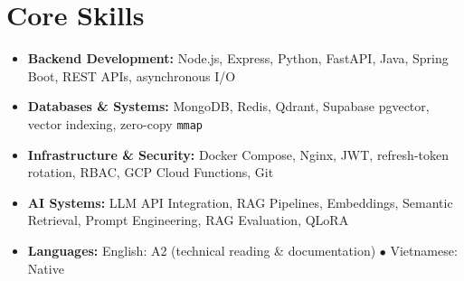 \documentclass[10pt,letterpaper]{article}
\begin{document}
\section{Core Skills}
\begin{itemize}[leftmargin=0pt, label={}, itemsep=1.2pt, topsep=1.0pt, partopsep=0pt, parsep=0pt]
  \item \small{\textbf{Backend Development:} Node.js, Express, Python, FastAPI, Java, Spring Boot, REST APIs, asynchronous I/O}
  \item \small{\textbf{Databases \& Systems:} MongoDB, Redis, Qdrant, Supabase pgvector, vector indexing, zero-copy \texttt{mmap}}
  \item \small{\textbf{Infrastructure \& Security:} Docker Compose, Nginx, JWT, refresh-token rotation, RBAC, GCP Cloud Functions, Git}
  \item \small{\textbf{AI Systems:} LLM API Integration, RAG Pipelines, Embeddings, Semantic Retrieval, Prompt Engineering, RAG Evaluation, QLoRA}
  \item \small{\textbf{Languages:} English: A2 (technical reading \& documentation) $\bullet$ Vietnamese: Native}
\end{itemize}

\end{document}
